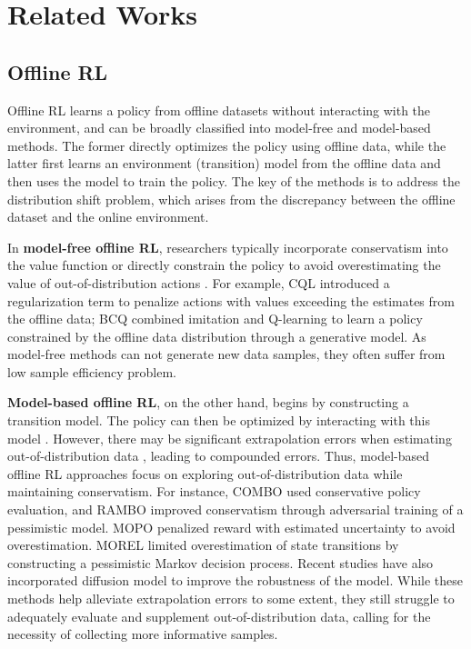 \documentclass[letterpaper]{article} %
\begin{document}
\section{Related Works}

\subsection{Offline RL}
Offline RL learns a policy from offline datasets without interacting with the environment, and can be broadly classified into model-free and model-based methods. The former directly optimizes the policy using offline data, while the latter first learns an environment (transition) model from the offline data and then uses the model to train the policy. The key of the methods is to address the distribution shift problem, which arises from the discrepancy between the offline dataset and the online environment.

In \textbf{model-free offline RL}, researchers typically incorporate conservatism into the value function or directly constrain the policy to avoid overestimating the value of out-of-distribution actions \cite{wu2019behavior,xu2022policy,kumar2019stabilizing,mcq,iql}. For example, CQL \cite{cql} introduced a regularization term to penalize actions with values exceeding the estimates from the offline data; BCQ \cite{wu2019behavior} combined imitation and Q-learning to learn a policy constrained by the offline data distribution through a generative model. As model-free methods can not generate new data samples, they often suffer from low sample efficiency problem.

\textbf{Model-based offline RL}, on the other hand, begins by constructing a transition model. The policy can then be optimized by interacting with this model \cite{mbpo,mopo,wang2021offline,lu2024synthetic}. However, there may be significant extrapolation errors when estimating out-of-distribution data \cite{extraerror}, leading to compounded errors. Thus, model-based offline RL approaches focus on exploring out-of-distribution data while maintaining conservatism. For instance, COMBO \cite{combo} used conservative policy evaluation, and RAMBO \cite{rambo} improved conservatism through adversarial training of a pessimistic model. MOPO \cite{mopo} penalized reward with estimated uncertainty to avoid overestimation. MOREL \cite{morel} limited overestimation of state transitions by constructing a pessimistic Markov decision process. Recent studies \cite{sun2024conformal,zhou2024diffusion} have also incorporated diffusion model to improve the robustness of the model. While these methods help alleviate extrapolation errors to some extent, they still struggle to adequately evaluate and supplement out-of-distribution data, calling for the necessity of collecting more informative samples.
\end{document}
